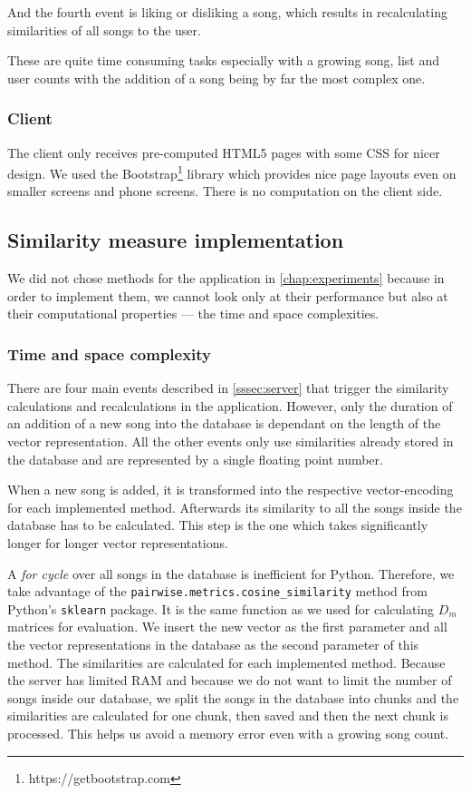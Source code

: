 And the fourth event is liking or disliking a song, which results in recalculating similarities of all songs to the user. 

These are quite time consuming tasks especially with a growing song, list and user counts with the addition of a song being by far the most complex one. 

\subsubsection{Client}
The client only receives pre-computed HTML5 pages with some CSS for nicer design. We used the Bootstrap\footnote{https://getbootstrap.com} library which provides nice page layouts even on smaller screens and phone screens. There is no computation on the client side.

\subsection{Similarity measure implementation}\label{ssec:measure_implementation}

We did not chose methods for the application in \ref{chap:experiments} because in order to implement them, we cannot look only at their performance but also at their computational properties --- the time and space complexities. 

\subsubsection{Time and space complexity}

There are four main events described in \ref{sssec:server} that trigger the similarity calculations and recalculations in the application. However, only the duration of an addition of a new song into the database is dependant on the length of the vector representation. All the other events only use similarities already stored in the database and are represented by a single floating point number.

When a new song is added, it is transformed into the respective vector-encoding for each implemented method. Afterwards its similarity to all the songs inside the database has to be calculated. This step is the one which takes significantly longer for longer vector representations. 

A \textit{for cycle} over all songs in the database is inefficient for Python. Therefore, we take advantage of the \texttt{pairwise.metrics.cosine\_similarity} method from Python's \texttt{sklearn} package. It is the same function as we used for calculating $D_m$ matrices for evaluation. 
We insert the new vector as the first parameter and all the vector representations in the database as the second parameter of this method. The similarities are calculated for each implemented method. Because the server has limited RAM and because we do not want to limit the number of songs inside our database, we split the songs in the database into chunks and the similarities are calculated for one chunk, then saved and then the next chunk is processed. This helps us avoid a memory error even with a growing song count.

